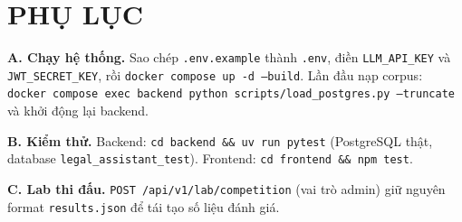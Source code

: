 \documentclass[12pt,a4paper]{report}
\numberwithin{equation}{chapter}
\numberwithin{figure}{chapter}
\numberwithin{table}{chapter}
\begin{document}
\clearpage
{}
{}
\chapter*{PHỤ LỤC}

\textbf{A. Chạy hệ thống.} Sao chép \texttt{.env.example} thành \texttt{.env},
điền \texttt{LLM\_API\_KEY} và \texttt{JWT\_SECRET\_KEY}, rồi
\texttt{docker compose up -d --build}. Lần đầu nạp corpus:
\texttt{docker compose exec backend python scripts/load\_postgres.py --truncate}
và khởi động lại backend.

\textbf{B. Kiểm thử.} Backend: \texttt{cd backend \&\& uv run pytest}
(PostgreSQL thật, database \texttt{legal\_assistant\_test}). Frontend:
\texttt{cd frontend \&\& npm test}.

\textbf{C. Lab thi đấu.} \texttt{POST /api/v1/lab/competition} (vai trò admin)
giữ nguyên format \texttt{results.json} để tái tạo số liệu đánh giá.
\end{document}
